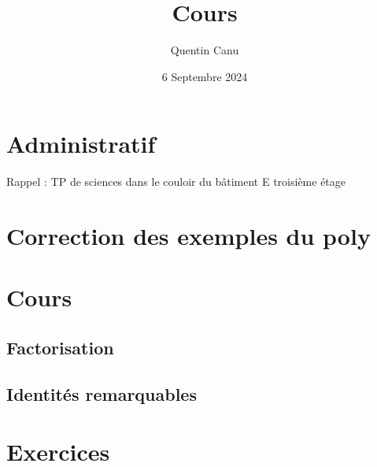 \documentclass{article}
\title{Cours}
\date{6 Septembre 2024}
\author{Quentin Canu}
\begin{document}
\maketitle
\section{Administratif}
Rappel : TP de sciences dans le couloir du bâtiment E troisième étage
\section{Correction des exemples du poly}
\section{Cours}
\subsection{Factorisation}
\subsection{Identités remarquables}
\section{Exercices}
\end{document}
